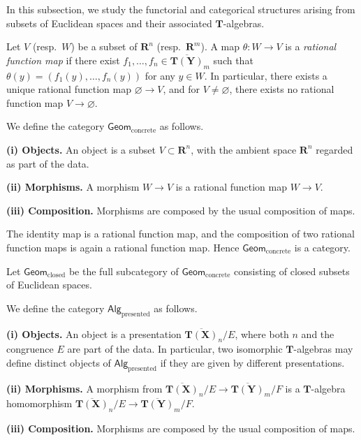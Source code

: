 \documentclass[a4paper,12pt]{amsart}
\theoremstyle{plain}
\theoremstyle{definition}
\begin{document}
In this subsection, we study the functorial and categorical structures arising from subsets of Euclidean spaces and their associated $\boldsymbol{T}$-algebras.

Let $V$ (resp.~$W$) be a subset of $\boldsymbol{R}^n$ (resp.~$\boldsymbol{R}^m$).
A map $\theta : W \to V$ is a \textit{rational function map} if there exist $f_1, \ldots, f_n \in \overline{\boldsymbol{T}(\boldsymbol{Y})}_m$ such that $\theta(y) = (f_1(y), \ldots, f_n(y))$ for any $y \in W$.
In particular, there exists a unique rational function map $\varnothing \to V$, and for $V \not= \varnothing$, there exists no rational function map $V \to \varnothing$.

We define the category $\mathsf{Geom}_{\mathrm{concrete}}$ as follows.

\textbf{(i) Objects.} An object is a subset $V \subset \boldsymbol{R}^n$, with the ambient space $\boldsymbol{R}^n$ regarded as part of the data.

\textbf{(ii) Morphisms.} A morphism $W \to V$ is a rational function map $W \to V$.

\textbf{(iii) Composition.} Morphisms are composed by the usual composition of maps.

The identity map is a rational function map, and the composition of two rational function maps is again a rational function map.
Hence $\mathsf{Geom}_{\mathrm{concrete}}$ is a category.

Let $\mathsf{Geom}_{\mathrm{closed}}$ be the full subcategory of $\mathsf{Geom}_{\mathrm{concrete}}$ consisting of closed subsets of Euclidean spaces.

\smallskip

We define the category $\mathsf{Alg}_{\mathrm{presented}}$ as follows.

\textbf{(i) Objects.} An object is a presentation $\overline{\boldsymbol{T}(\boldsymbol{X})}_n / E$, where both $n$ and the congruence $E$ are part of the data.
In particular, two isomorphic $\boldsymbol{T}$-algebras may define distinct objects of $\mathsf{Alg}_{\mathrm{presented}}$ if they are given by different presentations.

\textbf{(ii) Morphisms.} A morphism from $\overline{\boldsymbol{T}(\boldsymbol{X})}_n / E \to \overline{\boldsymbol{T}(\boldsymbol{Y})}_m / F$ is a $\boldsymbol{T}$-algebra homomorphism $\overline{\boldsymbol{T}(\boldsymbol{X})}_n / E \to \overline{\boldsymbol{T}(\boldsymbol{Y})}_m / F$.

\textbf{(iii) Composition.} Morphisms are composed by the usual composition of maps.
\end{document}
